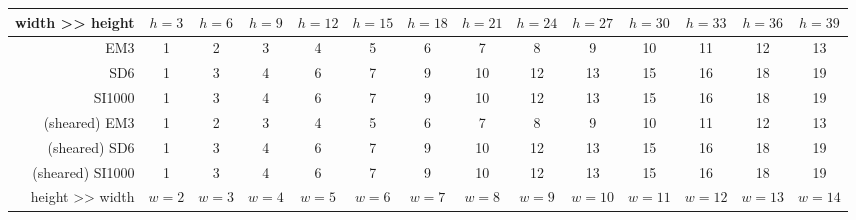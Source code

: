 \begin{tabular}{| r | c | c | c | c | c | c | c | c | c | c | c | c | c |}
    \hline
    width >> height &            $h=3$ &            $h=6$ &            $h=9$ &           $h=12$ &           $h=15$ &           $h=18$ &           $h=21$ &           $h=24$ &           $h=27$ &           $h=30$ &           $h=33$ &           $h=36$ &           $h=39$ \\
    \hline
                 EM3 &                1 &                2 &                3 &                4 &                5 &                6 &                7 &                8 &                9 &               10 &               11 &               12 &               13 \\
                 SD6 &                1 &                3 &                4 &                6 &                7 &                9 &               10 &               12 &               13 &               15 &               16 &               18 &               19 \\
              SI1000 &                1 &                3 &                4 &                6 &                7 &                9 &               10 &               12 &               13 &               15 &               16 &               18 &               19 \\
          (sheared) EM3 &                1 &                2 &                3 &                4 &                5 &                6 &                7 &                8 &                9 &               10 &               11 &               12 &               13 \\
          (sheared) SD6 &                1 &                3 &                4 &                6 &                7 &                9 &               10 &               12 &               13 &               15 &               16 &               18 &               19 \\
       (sheared) SI1000 &                1 &                3 &                4 &                6 &                7 &                9 &               10 &               12 &               13 &               15 &               16 &               18 &               19 \\
    \hline
    height >> width &            $w=2$ &            $w=3$ &            $w=4$ &            $w=5$ &            $w=6$ &            $w=7$ &            $w=8$ &            $w=9$ &           $w=10$ &           $w=11$ &           $w=12$ &           $w=13$ &           $w=14$ \\

\end{tabular}
